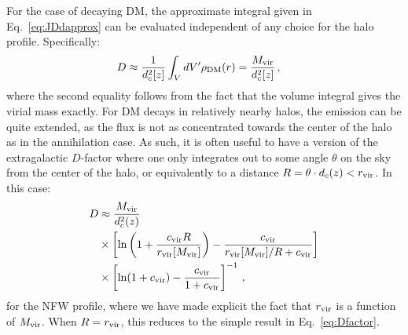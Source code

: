 For the case of decaying DM, the approximate integral given in Eq.~\ref{eq:JDdapprox} can be evaluated independent of any choice for the halo profile.   Specifically:
\begin{equation}\begin{aligned}
D &\approx \frac{1}{d_c^2[z]} \int_V dV' \rho_{\rm DM}(r) = \frac{M_{\rm vir}}{d_c^2[z]}\,,
\label{eq:Dfactor}
\end{aligned}\end{equation}
where the second equality follows from the fact that the volume integral gives the virial mass exactly.
For DM decays in relatively nearby halos, the emission can be quite extended, as the flux is not as concentrated towards the center of the halo as in the annihilation case.  As such, it is often useful to have a version of the extragalactic $D$-factor where one only integrates out to some angle $\theta$ on the sky from the center of the halo, or equivalently to a distance $R = \theta \cdot d_c(z) < r_{\rm vir}$. In this case:\begin{align}
D &\approx \frac{M_{\rm vir}}{d_c^2(z)} \\
&\times \left[ \ln \left( 1 + \frac{c_{\rm vir} R}{r_{\rm vir}[M_{\rm vir}]} \right) - \frac{c_{\rm vir}}{r_{\rm vir}[M_{\rm vir}]/R + c_{\rm vir}} \right] \notag \\
&\times \left[ \ln (1 + c_{\rm vir}) - \frac{c_{\rm vir}}{1+c_{\rm vir}} \right]^{-1}\,, \notag
\end{align}
for the NFW profile, where we have made explicit the fact that $r_{\rm vir}$ is a function of $M_{\rm vir}$.  When $R=r_{\rm vir}$, this reduces to the simple result in Eq.~\ref{eq:Dfactor}.



